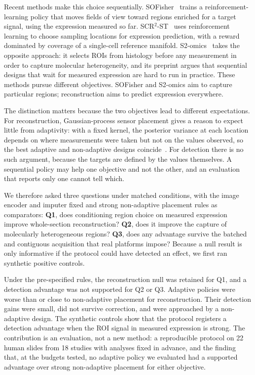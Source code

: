 \documentclass{article}
\begin{document}
Recent methods make this choice sequentially. SOFisher~\citep{li2026sofisher} trains a reinforcement-learning
policy that moves fields of view toward regions enriched for a target signal, using the expression measured
so far. SCR$^2$-ST~\citep{zhu2025scr2st} uses reinforcement learning to choose sampling locations for
expression prediction, with a reward dominated by coverage of a single-cell reference manifold. S2-omics~\citep{yuan2025s2omics}
takes the opposite approach: it selects ROIs from histology before any measurement in order to capture
molecular heterogeneity, and its preprint argues that sequential designs that wait for measured expression
are hard to run in practice. These methods pursue different objectives. SOFisher and S2-omics aim to capture
particular regions; reconstruction aims to predict expression everywhere.

The distinction matters because the two objectives lead to different expectations. For reconstruction,
Gaussian-process sensor placement gives a reason to expect little from adaptivity: with a fixed kernel, the
posterior variance at each location depends on where measurements were taken but not on the values observed,
so the best adaptive and non-adaptive designs coincide~\citep{krause2008near}. For detection there is no such
argument, because the targets are defined by the values themselves. A sequential policy may help one objective
and not the other, and an evaluation that reports only one cannot tell which.

We therefore asked three questions under matched conditions, with the image encoder and imputer fixed and
strong non-adaptive placement rules as comparators:
\textbf{Q1}, does conditioning region choice on measured expression improve whole-section reconstruction?
\textbf{Q2}, does it improve the capture of molecularly heterogeneous regions?
\textbf{Q3}, does any advantage survive the batched and contiguous acquisition that real platforms impose?
Because a null result is only informative if the protocol could have detected an effect, we first ran
synthetic positive controls.

Under the pre-specified rules, the reconstruction null was retained for Q1, and a detection advantage was
not supported for Q2 or Q3. Adaptive policies were worse than or close to non-adaptive placement for
reconstruction. Their detection gains were small, did not survive correction, and were approached by a
non-adaptive design. The synthetic controls show that the protocol registers a detection advantage when the
ROI signal in measured expression is strong. The contribution is an evaluation, not a new method: a
reproducible protocol on 22 human slides from 18 studies with analyses fixed in advance, and the finding that,
at the budgets tested, no adaptive policy we evaluated had a supported advantage over strong non-adaptive
placement for either objective.
\end{document}
